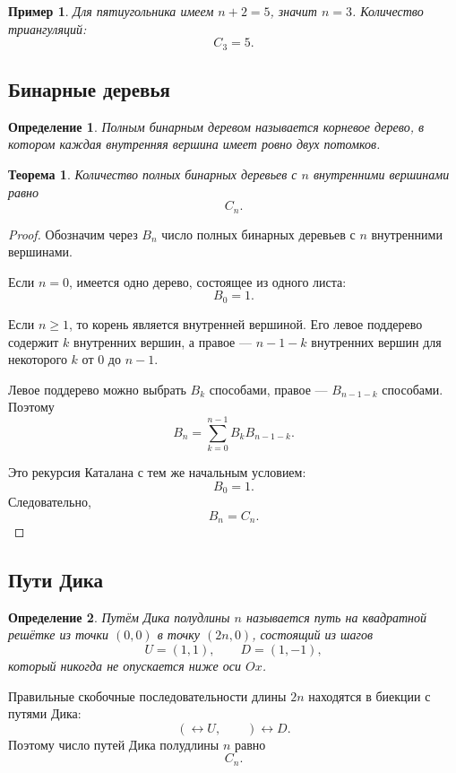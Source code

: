 \documentclass[12pt,a4paper]{article}
\newtheorem{theorem}{Теорема}
\newtheorem{definition}{Определение}
\newtheorem{example}{Пример}
\begin{document}
\begin{example}
Для пятиугольника имеем $n+2=5$, значит $n=3$. Количество триангуляций:
\[
C_3=5.
\]
\end{example}

\subsection{Бинарные деревья}

\begin{definition}
Полным бинарным деревом называется корневое дерево, в котором каждая внутренняя вершина имеет ровно двух потомков.
\end{definition}

\begin{theorem}
Количество полных бинарных деревьев с $n$ внутренними вершинами равно
\[
C_n.
\]
\end{theorem}

\begin{proof}
Обозначим через $B_n$ число полных бинарных деревьев с $n$ внутренними вершинами.

Если $n=0$, имеется одно дерево, состоящее из одного листа:
\[
B_0=1.
\]

Если $n\ge 1$, то корень является внутренней вершиной. Его левое поддерево содержит $k$ внутренних вершин, а правое --- $n-1-k$ внутренних вершин для некоторого $k$ от $0$ до $n-1$.

Левое поддерево можно выбрать $B_k$ способами, правое --- $B_{n-1-k}$ способами. Поэтому
\[
B_n=\sum_{k=0}^{n-1}B_kB_{n-1-k}.
\]

Это рекурсия Каталана с тем же начальным условием:
\[
B_0=1.
\]
Следовательно,
\[
B_n=C_n.
\]
\end{proof}

\subsection{Пути Дика}

\begin{definition}
Путём Дика полудлины $n$ называется путь на квадратной решётке из точки $(0,0)$ в точку $(2n,0)$, состоящий из шагов
\[
U=(1,1),\qquad D=(1,-1),
\]
который никогда не опускается ниже оси $Ox$.
\end{definition}

Правильные скобочные последовательности длины $2n$ находятся в биекции с путями Дика:
\[
( \leftrightarrow U,
\qquad
) \leftrightarrow D.
\]
Поэтому число путей Дика полудлины $n$ равно
\[
C_n.
\]
\end{document}
